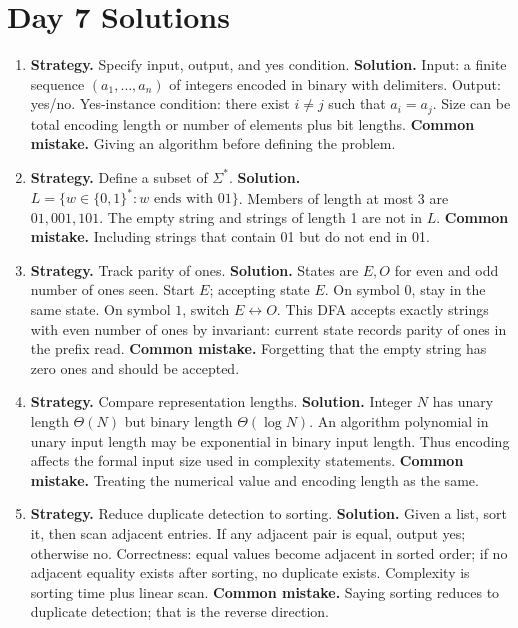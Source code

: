 \documentclass[11pt]{article}
\begin{document}
\section{Day 7 Solutions}
\begin{enumerate}[label=\textbf{7.\arabic*.}]
\item \textbf{Strategy.} Specify input, output, and yes condition. \textbf{Solution.} Input: a finite sequence $(a_1,\ldots,a_n)$ of integers encoded in binary with delimiters. Output: yes/no. Yes-instance condition: there exist $i\ne j$ such that $a_i=a_j$. Size can be total encoding length or number of elements plus bit lengths. \textbf{Common mistake.} Giving an algorithm before defining the problem.

\item \textbf{Strategy.} Define a subset of $\Sigma^*$. \textbf{Solution.} $L=\{w\in\{0,1\}^*: w \text{ ends with }01\}$. Members of length at most 3 are $01,001,101$. The empty string and strings of length 1 are not in $L$. \textbf{Common mistake.} Including strings that contain 01 but do not end in 01.

\item \textbf{Strategy.} Track parity of ones. \textbf{Solution.} States are $E,O$ for even and odd number of ones seen. Start $E$; accepting state $E$. On symbol $0$, stay in the same state. On symbol $1$, switch $E\leftrightarrow O$. This DFA accepts exactly strings with even number of ones by invariant: current state records parity of ones in the prefix read. \textbf{Common mistake.} Forgetting that the empty string has zero ones and should be accepted.

\item \textbf{Strategy.} Compare representation lengths. \textbf{Solution.} Integer $N$ has unary length $\Theta(N)$ but binary length $\Theta(\log N)$. An algorithm polynomial in unary input length may be exponential in binary input length. Thus encoding affects the formal input size used in complexity statements. \textbf{Common mistake.} Treating the numerical value and encoding length as the same.

\item \textbf{Strategy.} Reduce duplicate detection to sorting. \textbf{Solution.} Given a list, sort it, then scan adjacent entries. If any adjacent pair is equal, output yes; otherwise no. Correctness: equal values become adjacent in sorted order; if no adjacent equality exists after sorting, no duplicate exists. Complexity is sorting time plus linear scan. \textbf{Common mistake.} Saying sorting reduces to duplicate detection; that is the reverse direction.


\end{enumerate}
\end{document}
